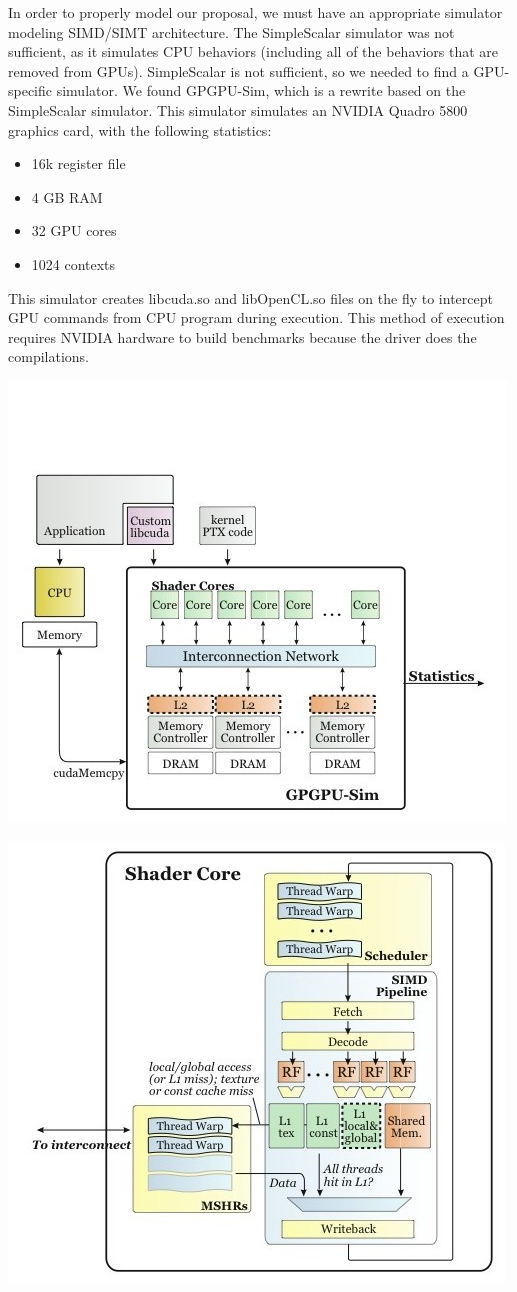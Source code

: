 \documentclass[conference]{IEEEtran}
\begin{document}
In order to properly model our proposal, we must have an appropriate simulator modeling SIMD/SIMT architecture.  The SimpleScalar simulator was not sufficient, as it simulates CPU behaviors (including all of the behaviors that are removed from GPUs).  SimpleScalar is not sufficient, so we needed to find a GPU-specific simulator.  We found GPGPU-Sim, which is a rewrite based on the SimpleScalar simulator.  This simulator simulates an NVIDIA Quadro 5800 graphics card, with the following statistics:

\begin{itemize}
	\item 16k register file
	\item 4 GB RAM
	\item 32 GPU cores
	\item 1024 contexts
\end{itemize}

This simulator creates libcuda.so and libOpenCL.so files on the fly to intercept GPU commands from CPU program during execution.  This method of execution requires NVIDIA hardware to build benchmarks because the driver does the compilations.

\begin{center}
	\includegraphics[width=.45\textwidth]{uarch1.jpg}
\end{center}

\begin{center}
	\includegraphics[width=.45\textwidth]{uarch2.jpg}
\end{center}
\end{document}
